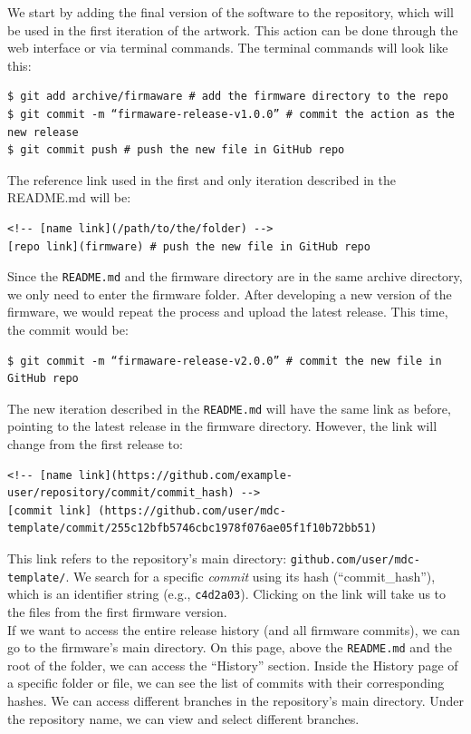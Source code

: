 We start by adding the final version of the software to the repository, which will be used in the first iteration of the artwork. This action can be done through the web interface or via terminal commands. The terminal commands will look like this:
\begin{lstlisting}[style=bash]
$ git add archive/firmaware # add the firmware directory to the repo
$ git commit -m “firmaware-release-v1.0.0” # commit the action as the new release
$ git commit push # push the new file in GitHub repo
\end{lstlisting}
The reference link used in the first and only iteration described in the README.md will be:
\begin{lstlisting}[style=markdown]
<!-- [name link](/path/to/the/folder) -->
[repo link](firmware) # push the new file in GitHub repo
\end{lstlisting}
Since the \texttt{README.md} and the firmware directory are in the same archive directory, we only need to enter the firmware folder. After developing a new version of the firmware, we would repeat the process and upload the latest release. This time, the commit would be:
\begin{lstlisting}[style=bash]
$ git commit -m “firmaware-release-v2.0.0” # commit the new file in GitHub repo
\end{lstlisting}
The new iteration described in the \texttt{README.md} will have the same link as before, pointing to the latest release in the firmware directory. However, the link will change from the first release to:
\begin{lstlisting}[style=markdown]
<!-- [name link](https://github.com/example-user/repository/commit/commit_hash) -->
[commit link] (https://github.com/user/mdc-template/commit/255c12bfb5746cbc1978f076ae05f1f10b72bb51)
\end{lstlisting}
This link refers to the repository's main directory: \texttt{github.com/user/mdc-template/}. We search for a specific \textit{commit} using its hash (``commit\_hash''), which is an identifier string (e.g., \texttt{c4d2a03}). Clicking on the link will take us to the files from the first firmware version.\\
If we want to access the entire release history (and all firmware commits), we can go to the firmware’s main directory. On this page, above the \texttt{README.md} and the root of the folder, we can access the ``History'' section. Inside the History page of a specific folder or file, we can see the list of commits with their corresponding hashes. We can access different branches in the repository's main directory. Under the repository name, we can view and select different branches.\\
